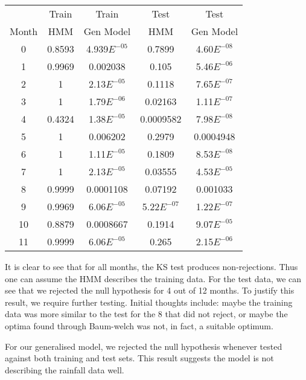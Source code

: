    \begin{center}
        \begin{tabular}{c c c c c}
                &  Train & Train     & Test &  Test \\  
            Month & HMM    & Gen Model & HMM  &  Gen Model\\
            0     &   0.8593  &   4.939$E^{-05}$  &   0.7899      &       4.60$E^{-08}$   \\
            1     &   0.9969  &   0.002038  &       0.105     &       5.46$E^{-06}$   \\
            2     &   1     &   2.13$E^{-05}$ &   0.1118      &       7.65$E^{-07}$   \\
            3     &   1     &   1.79$E^{-06}$ &   0.02163     &       1.11$E^{-07}$   \\
            4     &   0.4324  &   1.38$E^{-05}$ &   0.0009582 &       7.98$E^{-08}$   \\
            5     &   1     &   0.006202  &       0.2979      &       0.0004948  \\
            6     &   1     &   1.11$E^{-05}$ &   0.1809      &       8.53$E^{-08}$   \\
            7     &   1     &   2.13$E^{-05}$ &   0.03555     &       4.53$E^{-05}$   \\
            8     &   0.9999  &   0.0001108 &       0.07192     &       0.001033   \\
            9     &   0.9969  &   6.06$E^{-05}$ &   5.22$E^{-07}$ &   1.22$E^{-07}$   \\
            10      &   0.8879  &   0.0008667 &       0.1914      &       9.07$E^{-05}$   \\
            11      &   0.9999  &   6.06$E^{-05}$ &   0.265     &       2.15$E^{-06}$   

        \end{tabular}
    \end{center}


    It is clear to see that for all months, the KS test produces non-rejections. Thus one can assume the HMM describes the training data. For the test data, we can see that we rejected the null hypothesis for 4 out of 12 months. To justify this result, we require further testing. Initial thoughts include: maybe the training data was more similar to the test for the 8 that did not reject, or maybe the optima found through Baum-welch was not, in fact, a suitable optimum. 

    For our generalised model, we rejected the null hypothesis whenever tested against both training and test sets. This result suggests the model is not describing the rainfall data well. 